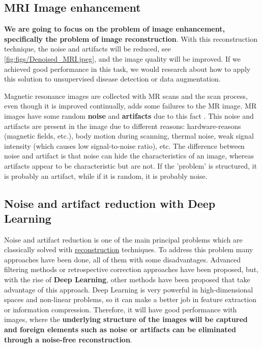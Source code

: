 \subsection{MRI Image enhancement}

\textbf{We are going to focus on the problem of image enhancement, specifically the problem of image reconstruction}. With this reconstruction technique, the noise and artifacts will be reduced, see \ref{fig:figs/Denoised_MRI.jpeg}, and the image quality will be improved. If we achieved good performance in this task, we would research about how to apply this solution to unsupervised disease detection or data augmentation.


Magnetic resonance images are collected with MR scans and the scan process, even though it is improved continually, adds some failures to the MR image. MR images have some random \textbf{noise} and \textbf{artifacts} due to this fact \cite{artifacts86}. This noise and artifacts are present in the image due to different reasons: hardware-reasons (magnetic fields, etc.), body motion during scanning, thermal noise, weak signal intensity (which causes low signal-to-noise ratio), etc. The difference between noise and artifact is that noise can hide the characteristics of an image, whereas artifacts appear to be characteristic but are not. If the 'problem' is structured, it is probably an artifact, while if it is random, it is probably noise.

\subsection{Noise and artifact reduction with Deep Learning}

Noise and artifact reduction is one of the main principal problems which are classically solved with \underline{reconstruction} techniques. To address this problem many approaches have been done, all of them with some disadvantages. Advanced filtering methods \cite{filtermeth12} or retrospective correction approaches have been proposed, but, with the rise of \textbf{Deep Learning}, other methods have been proposed that take advantage of this approach. Deep Learning is very powerful in high-dimensional spaces and non-linear problems, so it can make a better job in feature extraction or information compression. Therefore, it will have good performance with images, where the \textbf{underlying structure of the images will be captured and foreign elements such as noise or artifacts can be eliminated through a noise-free reconstruction}. 

